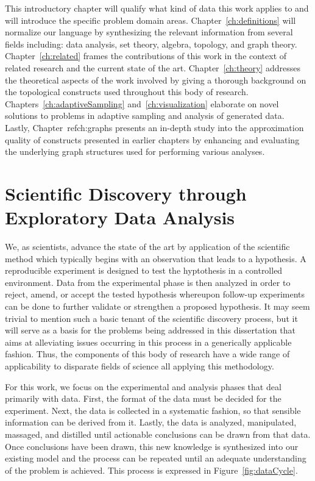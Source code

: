 This introductory chapter will qualify what kind of data this work applies to and will introduce the specific problem domain areas.
%
Chapter~\ref{ch:definitions} will normalize our language by synthesizing the relevant information from several fields including: data analysis, set theory, algebra, topology, and graph theory.
%
Chapter~\ref{ch:related} frames the contributions of this work in the context of related research and the current state of the art.
%
Chapter~\ref{ch:theory} addresses the theoretical aspects of the work involved by giving a thorough background on the topological constructs used throughout this body of research.
%
Chapters~\ref{ch:adaptiveSampling} and~\ref{ch:visualization} elaborate on novel solutions to problems in adaptive sampling and analysis of generated data.
%
Lastly, Chapter~ref{ch:graphs} presents an in-depth study into the approximation quality of constructs presented in earlier chapters by enhancing and evaluating the underlying graph structures used for performing various analyses.

\section{Scientific Discovery through Exploratory Data Analysis}

We, as scientists, advance the state of the art by application of the scientific method which typically begins with an observation that leads to a hypothesis.
%
A reproducible experiment is designed to test the hyptothesis in a controlled environment.
%
Data from the experimental phase is then analyzed in order to reject, amend, or accept the tested hypothesis whereupon follow-up experiments can be done to further validate or strengthen a proposed hypothesis.
%
It may seem trivial to mention such a basic tenant of the scientific discovery process, but it will serve as a basis for the problems being addressed in this dissertation that aims at alleviating issues occurring in this  process in a generically applicable fashion.
%
Thus, the components of this body of research have a wide range of applicability to disparate fields of science all applying this methodology.

For this work, we focus on the experimental and analysis phases that deal primarily with data.
%
First, the format of the data must be decided for the experiment.
%
Next, the data is collected in a systematic fashion, so that sensible information can be derived from it.
%
Lastly, the data is analyzed, manipulated, massaged, and distilled until actionable conclusions can be drawn from that data.
%
Once conclusions have been drawn, this new knowledge is synthesized into our existing model and the process can be repeated until an adequate understanding of the problem is achieved.
%
This process is expressed in Figure~\ref{fig:dataCycle}.


